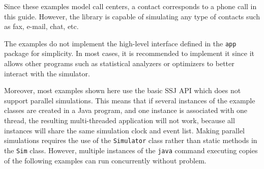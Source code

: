 Since these examples model call centers, a contact corresponds to a
phone call in this guide.  However, the library is capable of
simulating any type of contacts such as fax, e-mail, chat, etc.

The examples do not implement the high-level interface defined in the
\texttt{app} package for simplicity.  In most cases, it is recommended
to implement it since it allows other programs such as statistical
analyzers or optimizers to better interact with the simulator.

Moreover, most examples shown here use the basic SSJ API which does not
support parallel simulations.
This means that
if several instances of the example classes are created
in a Java program, and one
instance is associated with one thread, the resulting multi-threaded
application will not work, because all instances will share the same
simulation clock and event list.
Making parallel simulations requires the use of the \texttt{Simulator}
class rather than static methods in the \texttt{Sim} class.
However, multiple instances of the \texttt{java} command
executing copies of the following examples can run
concurrently without problem.

